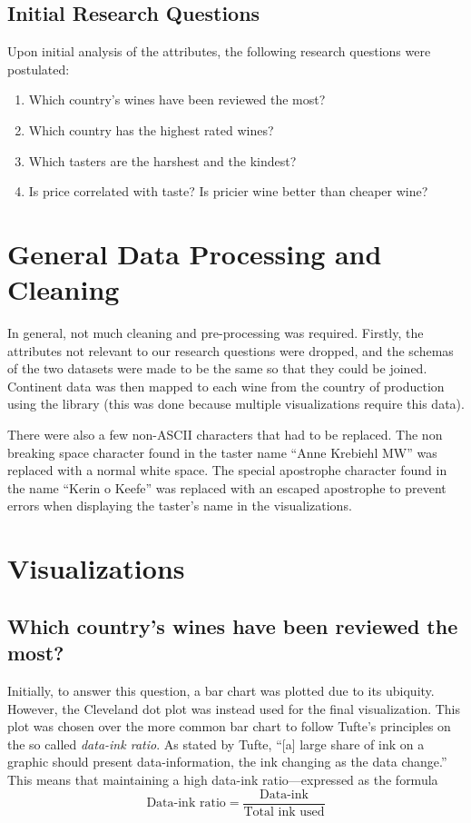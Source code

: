\subsection{Initial Research Questions}
Upon initial analysis of the attributes, the following research questions were postulated:
\begin{enumerate}
    \setlength\itemsep{0.1em}
    \item Which country's wines have been reviewed the most?
    \item Which country has the highest rated wines?
    \item Which tasters are the harshest and the kindest?
    \item Is price correlated with taste? Is pricier wine better than cheaper wine?
\end{enumerate}

\section{General Data Processing and Cleaning}
In general, not much cleaning and pre-processing was required. Firstly, the attributes not relevant to our research questions were dropped, and the schemas of the two datasets were made to be the same so that they could be joined. Continent data was then mapped to each wine from the country of production using the library  (this was done because multiple visualizations require this data). 

There were also a few non-ASCII characters that had to be replaced. The non breaking space character found in the taster name ``Anne Krebiehl MW'' was replaced with a normal white space. The special apostrophe character found in the name ``Kerin o \textquotesingle Keefe'' was replaced with an escaped apostrophe to prevent errors when displaying the taster's name in the visualizations.

\section{Visualizations}

\subsection{Which country's wines have been reviewed the most?}
Initially, to answer this question, a bar chart was plotted due to its ubiquity. However, the Cleveland dot plot was instead used for the final visualization. This plot was chosen over the more common bar chart to follow Tufte's principles on the so called \emph{data-ink ratio}. As stated by Tufte, ``[a] large share of ink on a graphic should present data-information, the ink changing as the data change.'' This means that maintaining a high data-ink ratio---expressed as the formula
$$
\textrm{Data-ink ratio} = \frac{\textrm{Data-ink}}{\textrm{Total ink used}}
$$

